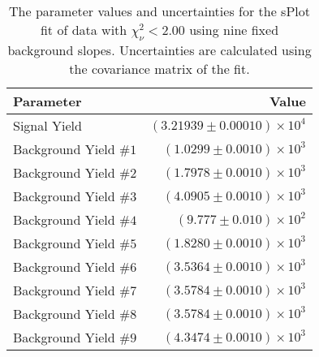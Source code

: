 
\begin{table}[ht]
    \begin{center}
        \begin{tabular}{lr}\toprule
            Parameter & Value \\\midrule
            Signal Yield & $(3.21939 \pm 0.00010) \times 10^{4}$ \\
            Background Yield $\#1$ & $(1.0299 \pm 0.0010) \times 10^{3}$ \\
            Background Yield $\#2$ & $(1.7978 \pm 0.0010) \times 10^{3}$ \\
            Background Yield $\#3$ & $(4.0905 \pm 0.0010) \times 10^{3}$ \\
            Background Yield $\#4$ & $(9.777 \pm 0.010) \times 10^{2}$ \\
            Background Yield $\#5$ & $(1.8280 \pm 0.0010) \times 10^{3}$ \\
            Background Yield $\#6$ & $(3.5364 \pm 0.0010) \times 10^{3}$ \\
            Background Yield $\#7$ & $(3.5784 \pm 0.0010) \times 10^{3}$ \\
            Background Yield $\#8$ & $(3.5784 \pm 0.0010) \times 10^{3}$ \\
            Background Yield $\#9$ & $(4.3474 \pm 0.0010) \times 10^{3}$ \\\bottomrule
        \end{tabular}
        \caption{The parameter values and uncertainties for the sPlot fit of data with $\chi^2_\nu < 2.00$ using nine fixed background slopes. Uncertainties are calculated using the covariance matrix of the fit.}\label{tab:splot-fit-results-chisqdof-2.00-fixed-9}
    \end{center}
\end{table}
